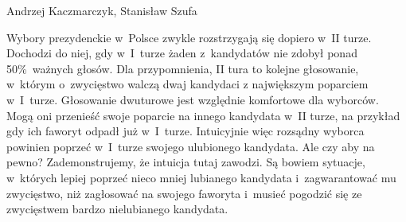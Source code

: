 

\newcommand{\marked}[1]{#1}
\newcommand{\textmarked}[1]{#1}

%
%
{Andrzej Kaczmarczyk,  Stanisław Szufa}
%
%
%

Wybory prezydenckie w~Polsce zwykle rozstrzygają się dopiero w~II turze.
%
Dochodzi do niej, gdy
w~I~turze żaden z~kandydatów nie zdobył ponad 50\%~ważnych głosów.
Dla przypomnienia, II tura to kolejne głosowanie, w~którym o~zwycięstwo walczą
dwaj kandydaci z największym poparciem %
w~I~turze.
Głosowanie dwuturowe jest względnie komfortowe dla wyborców.
Mogą oni przenieść swoje poparcie na innego kandydata w~II turze, na przykład gdy ich faworyt odpadł już w~I~turze.
Intuicyjnie więc rozsądny wyborca powinien poprzeć w~I~turze swojego ulubionego kandydata.
Ale czy aby na pewno?
Zademonstrujemy,
że intuicja tutaj zawodzi. Są bowiem sytuacje, w~których lepiej poprzeć
nieco mniej lubianego kandydata i~zagwarantować mu zwycięstwo, niż zagłosować na swojego faworyta i~musieć pogodzić się ze
zwycięstwem bardzo nielubianego kandydata.
%


